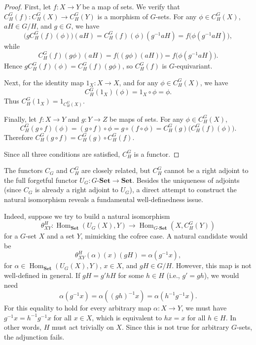 \documentclass[10pt,a4paper]{amsart}
\begin{document}
\begin{proof}
First, let $f \colon X \longrightarrow Y$ be a map of sets. We verify that $C_H^G(f) \colon C_H^G(X) \longrightarrow C_H^G(Y)$ is a morphism of $G$-sets. For any $\phi \in C_H^G(X)$, $aH \in G/H$, and $g \in G$, we have
\[
\bigl(g C_H^G(f)(\phi)\bigr)(aH)
= C_H^G(f)(\phi)(g^{-1}aH)
= f\bigl(\phi(g^{-1}aH)\bigr),
\]
while
\[
C_H^G(f)(g \phi)(aH)
= f\bigl((g \phi)(aH)\bigr)
= f\bigl(\phi(g^{-1}aH)\bigr).
\]
Hence $g C_H^G(f)(\phi) = C_H^G(f)(g \phi)$, so $C_H^G(f)$ is $G$-equivariant.

Next, for the identity map $1_X \colon X \longrightarrow X$, and for any $\phi \in C_H^G(X)$, we have
\[
C_H^G(1_X)(\phi) = 1_X \circ \phi = \phi.
\]
Thus $C_H^G(1_X) = 1_{C_H^G(X)}$.

Finally, let $f \colon X \longrightarrow Y$ and $g \colon Y \longrightarrow Z$ be maps of sets. For any $\phi \in C_H^G(X)$,
\[
C_H^G(g \circ f)(\phi) = (g \circ f) \circ \phi = g \circ (f \circ \phi) = C_H^G(g)\bigl(C_H^G(f)(\phi)\bigr).
\]
Therefore $C_H^G(g \circ f) = C_H^G(g) \circ C_H^G(f)$.

Since all three conditions are satisfied, $C_H^G$ is a functor.
\end{proof}

The functors $C_G$ and $C_H^G$ are closely related, but $C_H^G$ cannot be a right adjoint to the full forgetful functor $U_G \colon G\text{-}\mathbf{Set} \rightarrow \mathbf{Set}$. 
Besides the uniqueness of adjoints (since $C_G$ is already a right adjoint to $U_G$), a direct attempt to construct the natural isomorphism reveals a fundamental well-definedness issue.

Indeed, suppose we try to build a natural isomorphism
\[
\theta^H_{XY} \colon \operatorname{Hom}_{\mathbf{Set}}(U_G(X), Y) 
\longrightarrow \operatorname{Hom}_{G\text{-}\mathbf{Set}}(X, C_H^G(Y))
\]
for a $G$-set $X$ and a set $Y$, mimicking the cofree case. A natural candidate would be
\[
\theta^H_{XY}(\alpha)(x)(gH) = \alpha(g^{-1}x),
\]
for $\alpha \in \operatorname{Hom}_{\mathbf{Set}}(U_G(X), Y)$, $x \in X$, and $gH \in G/H$. However, this map is not well-defined in general. If $gH = g'hH$ for some $h \in H$ (i.e., $g' = gh$), we would need
\[
\alpha(g^{-1}x) = \alpha((gh)^{-1}x) = \alpha(h^{-1}g^{-1}x).
\]
For this equality to hold for every arbitrary map $\alpha \colon X \rightarrow Y$, we must have $g^{-1}x = h^{-1}g^{-1}x$ for all $x \in X$, which is equivalent to $h x = x$ for all $h \in H$. In other words, $H$ must act trivially on $X$. Since this is not true for arbitrary $G$-sets, the adjunction fails.
\end{document}
